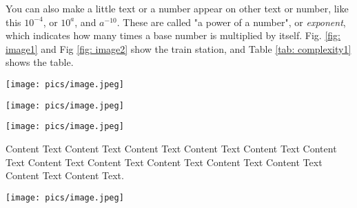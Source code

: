\begin{Chapter}
You can also make a little text or a number appear on other text or number, like this $10^{-4}$, or $10^{a}$, and $a^{-10}$. These are called "a power of a number", or \textit{exponent}, which indicates how many times a base number is multiplied by itself. Fig. \ref{fig: image1} and Fig \ref{fig: image2} show the train station, and Table \ref{tab: complexity1} shows the table.

\begin{figure*}[htbp]
    \centering
    \texttt{[image: pics/image.jpeg]}
    \caption{Cool train station}
    \label{fig: image1}
\end{figure*}

\begin{figure*}[htbp]
    \centering
    \texttt{[image: pics/image.jpeg]}
    \caption{This cool train station stands as a metaphor for life itself, everyone's waiting, no one knows when their train will arrive, and someone's always holding the wrong ticket. Yet, we all stand here pretending everything's fine, sipping overpriced coffee with quiet determination}
    \label{fig: image2}
\end{figure*}

\begin{figure*}[htbp]
    \centering
    \texttt{[image: pics/image.jpeg]}
    \caption{Cool train station}
    \label{fig: image2}
\end{figure*}

Content Text Content Text Content Text Content Text Content Text Content Text Content Text Content Text Content Text Content Text Content Text Content Text Content Text.

\begin{figure*}[htbp]
    \centering
    \texttt{[image: pics/image.jpeg]}
    \caption{Cool train station}
    \label{fig: image}
\end{figure*}

\end{Chapter}